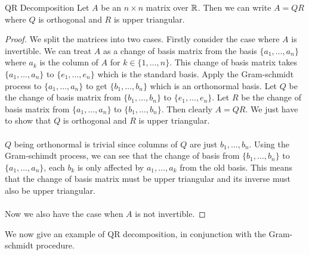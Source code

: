 \documentclass[a4paper]{article}
\begin{document}
\begin{thm}{QR Decomposition}{} Let $A$ be an $n\times n$ matrix over $\mathbb{R}$. Then we can write $A=QR$ where $Q$ is orthogonal and $R$ is upper triangular. \tcbline
\begin{proof}We split the matrices into two cases. Firstly consider the case where $A$ is invertible. We can treat $A$ as a change of basis matrix from the basis $\{a_1,\dots,a_n\}$ where $a_k$ is the column of $A$ for $k\in\{1,\dots,n\}$. This change of basis matrix takes $\{a_1,\dots,a_n\}$ to $\{e_1,\dots,e_n\}$ which is the standard basis. Apply the Gram-schmidt process to $\{a_1,\dots,a_n\}$ to get $\{b_1,\dots,b_n\}$ which is an orthonormal basis. Let $Q$ be the change of basis matrix from $\{b_1,\dots,b_n\}$ to $\{e_1,\dots,e_n\}$. Let $R$ be the change of basis matrix from $\{a_1,\dots,a_n\}$ to $\{b_1,\dots,b_n\}$. Then clearly $A=QR$. We just have to show that $Q$ is orthogonal and $R$ is upper triangular. \\~\\
$Q$ being orthonormal is trivial since columns of $Q$ are just $b_1,\dots,b_n$. Using the Gram-schimdt process, we can see that the change of basis from $\{b_1,\dots,b_n\}$ to $\{a_1,\dots,a_n\}$, each $b_k$ is only affected by $a_1,\dots,a_k$ from the old basis. This means that the change of basis matrix must be upper triangular and its inverse must also be upper triangular. \\~\\
Now we also have the case when $A$ is not invertible. 
\end{proof}
\end{thm}

We now give an example of QR decomposition, in conjunction with the Gram-schmidt procedure. 
\end{document}
